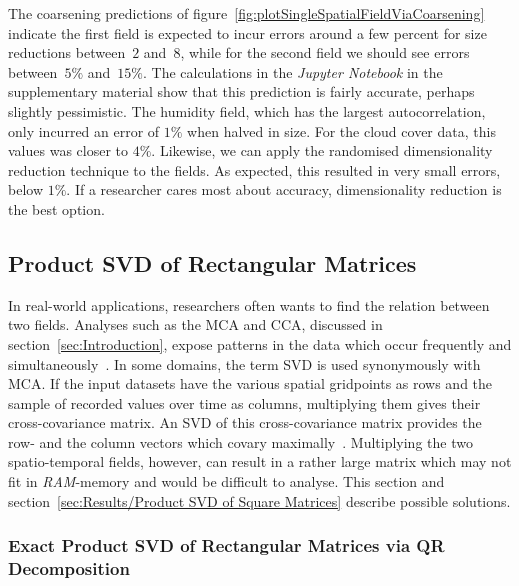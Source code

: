 \documentclass[ijgi,article,submit,moreauthors,pdftex,10pt,a4paper]{Definitions/mdpi}
\begin{document}
The coarsening predictions of figure~\ref{fig:plotSingleSpatialFieldViaCoarsening} indicate the first field is expected to incur errors around a few percent for size reductions between~$2$ and~$8$, while for the second field we should see errors between~$5\%$ and~$15\%$. The calculations in the \textit{Jupyter Notebook} in the supplementary material show that this prediction is fairly accurate, perhaps slightly pessimistic. The humidity field, which has the largest autocorrelation, only incurred an error of $1\%$ when halved in size. For the cloud cover data, this values was closer to $4\%$. Likewise, we can apply the randomised dimensionality reduction technique to the fields. As expected, this resulted in very small errors, below $1\%$. If a researcher cares most about accuracy, dimensionality reduction is the best option.

\subsection{Product SVD of Rectangular Matrices}
\label{sec:Results/Product SVD of Rectangular Matrices}

In real-world applications, researchers often wants to find the relation between two fields. Analyses such as the MCA and CCA, discussed in section~\ref{sec:Introduction}, expose patterns in the data which occur frequently and simultaneously~\cite{Eshel2011, Storch1999}. In some domains, the term SVD is used synonymously with MCA. If the input datasets have the various spatial gridpoints as rows and the sample of recorded values over time as columns, multiplying them gives their cross-covariance matrix. An SVD of this cross-covariance matrix provides the row- and the column vectors which covary maximally~\cite{Bretherton1992}. Multiplying the two spatio-temporal fields, however, can result in a rather large matrix which may not fit in \textit{RAM}-memory and would be difficult to analyse. This section and section~\ref{sec:Results/Product SVD of Square Matrices} describe possible solutions.

\subsubsection{Exact Product SVD of Rectangular Matrices via QR Decomposition}
\label{sec:Results/Exact Product SVD of Rectangular Matrices via QR Decomposition} %
\end{document}
